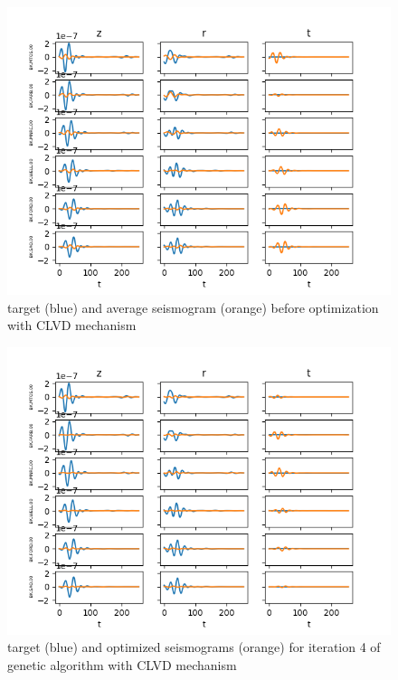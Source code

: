 \documentclass{article}
\begin{document}
\begin{figure}[H]
	\centering
	\includegraphics{dataSet3/plots/optimized0.png}
	\caption{target (blue) and average seismogram (orange) before optimization with CLVD mechanism}
	\label{convergenceCLVD1}
\end{figure}
\begin{figure}[H]
	\centering
	\includegraphics{dataSet3/plots/optimized3.png}
	\caption{target (blue) and optimized seismograms (orange) for iteration 4 of genetic algorithm with CLVD mechanism}
	\label{convergenceCLVD2}
\end{figure}
\end{document}
